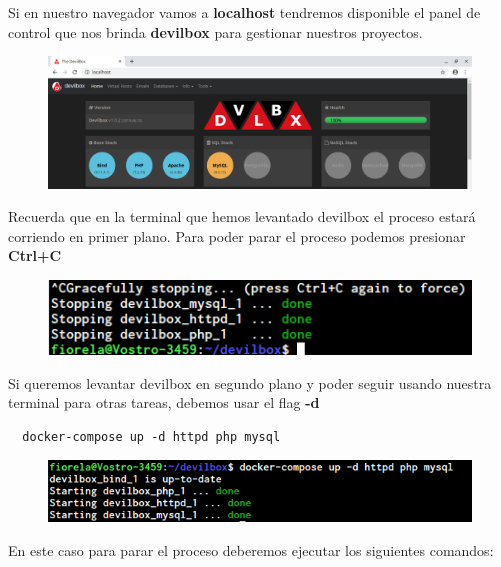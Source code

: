 \documentclass{article}
\begin{document}
Si en nuestro navegador vamos a \textbf{localhost} tendremos disponible el
panel de control que nos brinda \textbf{devilbox} para gestionar nuestros
proyectos.

\begin{figure}[h!]
  \centering
  \includegraphics[scale=0.5]{./Pictures/Devilbox/017_localhost.png}
\end{figure}

Recuerda que en la terminal que hemos levantado devilbox el proceso estará
corriendo en primer plano. Para poder parar el proceso podemos presionar
\textbf{Ctrl+C}\\

\begin{figure}[h!]
  \centering
  \includegraphics[scale=0.75]{./Pictures/Devilbox/018_ctrlc.png}
\end{figure}

Si queremos levantar devilbox en segundo plano y poder seguir usando nuestra
terminal para otras tareas, debemos usar el flag \textbf{-d}\\

\begin{verbatim}
  docker-compose up -d httpd php mysql
\end{verbatim}

\begin{figure}[h!]
  \centering
  \includegraphics[scale=0.75]{./Pictures/Devilbox/019_backgroud.png}
\end{figure}

En este caso para parar el proceso deberemos ejecutar los siguientes
comandos:\\
\end{document}
